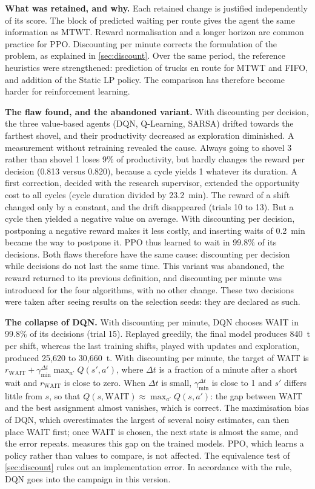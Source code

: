 \documentclass[11pt,a4paper]{article}
\newif\ifrevmarks
\newcommand{\revtag}[1]{\ifrevmarks\textsuperscript{\textcolor{red!70!black}{\scriptsize[#1]}}\fi}
\newenvironment{revbloc}[1]{\par\ifrevmarks\color{revcolor}\noindent\revtag{#1}\ \fi}{\par}
\newif\ifcorrmarks
\newcommand{\corr}[1]{\ifcorrmarks\textcolor{corrcolor}{#1}\else#1\fi}
\begin{document}
\begin{revbloc}{v3}
\textbf{What was retained, and why.} Each retained change is justified independently of its score. The block of predicted waiting per route gives the agent the same information as MTWT. Reward normalisation and a longer horizon are common practice for PPO. Discounting per minute corrects the formulation of the problem, as explained in \cref{sec:discount}. Over the same period, the reference heuristics were strengthened: prediction of trucks en route for MTWT and FIFO, and addition of the \corr{Static LP} policy. The comparison has therefore become harder for reinforcement learning.

\textbf{The flaw found, and the abandoned variant.} With discounting per decision, the three value-based agents (DQN, Q-Learning, SARSA) drifted towards the farthest shovel, and their productivity decreased as exploration diminished. A measurement without retraining revealed the cause. Always going to shovel 3 rather than shovel 1 loses 9\% of productivity, but hardly changes the reward per decision (0.813 versus 0.820), because a cycle yields 1 whatever its duration. A first correction, decided with the research supervisor, extended the opportunity cost to all cycles (cycle duration divided by 23.2~min). The reward of a shift changed only by a constant, and the drift disappeared (trials 10 to 13). But a cycle then yielded a negative value on average. With discounting per decision, postponing a negative reward makes it less costly, and inserting waits of 0.2~min became the way to postpone it. PPO thus learned to wait in 99.8\% of its decisions. Both flaws therefore have the same cause: discounting per decision while decisions do not last the same time. This variant was abandoned, the reward returned to its previous definition, and discounting per minute was introduced for the four algorithms, with no other change. These two decisions were taken after seeing results on the selection seeds: they are declared as such.

\textbf{The collapse of DQN.} With discounting per minute, DQN chooses WAIT in 99.8\% of its decisions (trial 15). Replayed greedily, the final model produces 840~t per shift, whereas the last training shifts, played with updates and exploration, produced 25{,}620 to 30{,}660~t. \corr{With discounting per minute, the target of WAIT is $r_{\mathrm{WAIT}} + \gamma_{\min}^{\Delta t}\max_{a'} Q(s',a')$, where $\Delta t$ is a fraction of a minute after a short wait and $r_{\mathrm{WAIT}}$ is close to zero. When $\Delta t$ is small, $\gamma_{\min}^{\Delta t}$ is close to 1 and $s'$ differs little from $s$, so that $Q(s,\mathrm{WAIT}) \approx \max_{a'} Q(s,a')$: the gap between WAIT and the best assignment almost vanishes, which is correct. The maximisation bias of DQN, which overestimates the largest of several noisy estimates, can then place WAIT first; once WAIT is chosen, the next state is almost the same, and the error repeats. \Cref{sec:ablation} measures this gap on the trained models.} PPO, which learns a policy rather than values to compare, is not affected. The equivalence test of \cref{sec:discount} rules out an implementation error. In accordance with the rule, DQN goes into the campaign in this version.


\end{revbloc}
\end{document}
